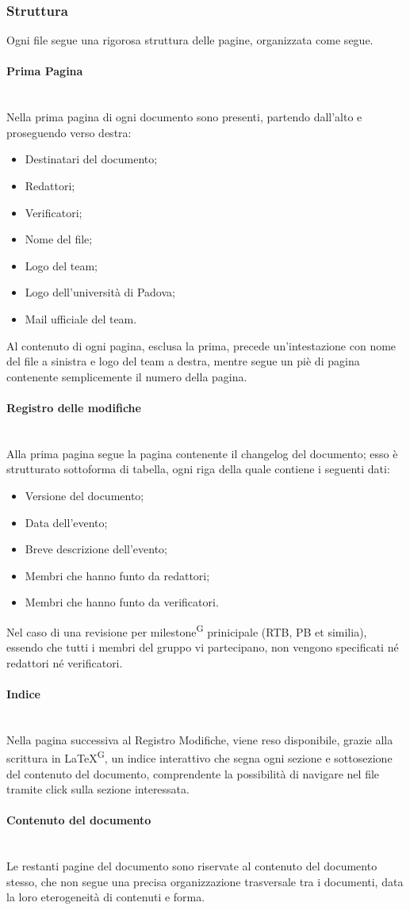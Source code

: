 \documentclass[8pt]{article}
\newcommand{\glossterm}[1]{#1\textsuperscript{G}} %
\newcommand{\subsubsubsection}[1]{\paragraph{#1}\mbox{}\\}
\begin{document}
\subsubsection{Struttura}
Ogni file segue una rigorosa struttura delle pagine, organizzata come segue.
\subsubsubsection{Prima Pagina}
Nella prima pagina di ogni documento sono presenti, partendo dall'alto e proseguendo verso destra:
\begin{itemize}
    \item Destinatari del documento;
    \item Redattori;
    \item Verificatori;
    \item Nome del file; 
    \item Logo del team;
    \item Logo dell'università di Padova;
    \item Mail ufficiale del team.
\end{itemize}
Al contenuto di ogni pagina, esclusa la prima, precede un'intestazione con nome del file a sinistra e logo del team a destra, mentre segue un piè di pagina contenente semplicemente il numero della pagina. 
\subsubsubsection{Registro delle modifiche}
Alla prima pagina segue la pagina contenente il changelog del documento; esso è strutturato sottoforma di tabella, ogni riga della quale contiene i seguenti dati:
\begin{itemize}
    \item Versione del documento;
    \item Data dell'evento;
    \item Breve descrizione dell'evento;
    \item Membri che hanno funto da redattori;
    \item Membri che hanno funto da verificatori.
\end{itemize}
Nel caso di una revisione per \glossterm{milestone} prinicipale (RTB, PB et similia), essendo che tutti i membri del gruppo vi partecipano, non vengono specificati né redattori né verificatori. 
\subsubsubsection{Indice}
Nella pagina successiva al Registro Modifiche, viene reso disponibile, grazie alla scrittura in \glossterm{\LaTeX}, un indice interattivo che segna ogni sezione e sottosezione del contenuto del documento, comprendente la possibilità di navigare nel file tramite click sulla sezione interessata.
\subsubsubsection{Contenuto del documento}
Le restanti pagine del documento sono riservate al contenuto del documento stesso, che non segue una precisa organizzazione trasversale tra i documenti, data la loro eterogeneità di contenuti e forma.
\end{document}
